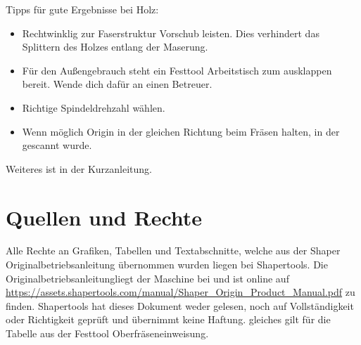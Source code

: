 \documentclass{\basedir/fablab-document}
\begin{document}
Tipps für gute Ergebnisse bei Holz:
\begin{itemize}
    \item Rechtwinklig zur Faserstruktur Vorschub leisten. Dies verhindert das Splittern des Holzes entlang der Maserung.
    \item Für den Außengebrauch steht ein Festtool Arbeitstisch zum ausklappen bereit. Wende dich dafür an einen Betreuer.
    \item Richtige Spindeldrehzahl wählen.
    \item Wenn möglich Origin in der gleichen Richtung beim Fräsen halten, in der gescannt wurde.
\end{itemize}

Weiteres ist in der Kurzanleitung.

\section{Quellen und Rechte}
\label{quellen}
Alle Rechte an Grafiken, Tabellen und Textabschnitte, welche aus der Shaper Originalbetriebsanleitung übernommen wurden liegen bei Shapertools. Die \glqq Originalbetriebsanleitung\grqq liegt der Maschine bei und ist online auf \url{https://assets.shapertools.com/manual/Shaper_Origin_Product_Manual.pdf} zu finden. Shapertools hat dieses Dokument weder gelesen, noch auf Vollständigkeit oder Richtigkeit geprüft und übernimmt keine Haftung. gleiches gilt für die Tabelle aus der Festtool Oberfräseneinweisung.
\end{document}
